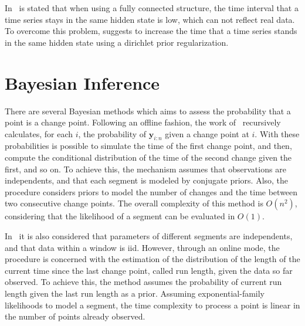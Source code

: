 In~\cite{inertial_hidden_markov_models_modeling_change_in_multivariate_time_series}
is stated that when using a fully connected structure, the time interval that a
time series stays in the same hidden state is low, which can not reflect real
data. To overcome this problem,
\cite{inertial_hidden_markov_models_modeling_change_in_multivariate_time_series}
suggests to increase the time that a time series stands in the same hidden
state using a dirichlet prior regularization.

\section{Bayesian Inference}

There are several Bayesian methods which aims to assess the probability that a
point is a change point. Following an offline fashion, the work
of~\cite{exact_and_efficient_bayesian_inference_for_multiple_changepoint_problems}
recursively calculates, for each $i$, the probability of $\mathbf{y}_{i : n}$
given a change point at $i$. With these probabilities is possible to simulate
the time of the first change point, and then, compute the conditional
distribution of the time of the second change given the first, and so on. To
achieve this, the mechanism assumes that observations are independents, and that
each segment is modeled by conjugate priors. Also, the procedure considers
priors to model the number of changes and the time between two consecutive
change points. The overall complexity of this method is $O(n^{2})$, considering
that the likelihood of a segment can be evaluated in $O(1)$.

In~\cite{bayesian_online_changepoint_detection} it is also considered that
parameters of different segments are independents, and that data within a
window is iid. However, through an online mode, the procedure is concerned with
the estimation of the distribution of the length of the current time since the
last change point, called run length, given the data so far observed. To achieve
this, the method assumes the probability of current run length given the last
run length as a prior. Assuming exponential-family likelihoods to model a
segment, the time complexity to process a point is linear in the number of
points already observed.
